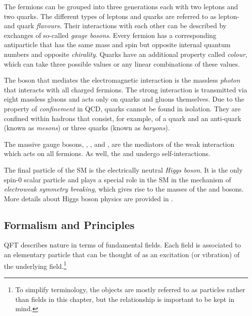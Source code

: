 The fermions can be grouped into three generations each with two leptons and two quarks. The different types of leptons and quarks are referred to as lepton- and quark \emph{flavours}.
Their interactions with each other can be described by exchanges of so-called \emph{gauge bosons}.
Every fermion has a corresponding antiparticle that has the same mass and spin but opposite internal quantum numbers and opposite \emph{chirality}.
Quarks have an additional property called \emph{colour}, which can take three possible values or any linear combinations of these values.

The boson that mediates the electromagnetic interaction is the massless \emph{photon} that interacts with all charged fermions.
The strong interaction is transmitted via eight massless gluons and acts only on quarks and gluons themselves.
Due to the property of \emph{confinement} in QCD, quarks cannot be found in isolation. They are confined within hadrons that consist, for example, of a quark and an anti-quark (known as \emph{mesons}) or three quarks (known as \emph{baryons}).

The massive gauge bosons, \Wplus, \Wminus, and \Zboson, are the mediators of the weak interaction which acts on all fermions. As well, the \Wmp and \Zboson undergo self-interactions.

The final particle of the SM is the electrically neutral \emph{Higgs boson}. It is the only spin-0 scalar particle and plays a special role in the SM in the mechanism of \emph{electroweak symmetry breaking}, which gives rise to the masses of the \Wpm and \Zboson bosons. More details about Higgs boson physics are provided in .


\subsection{Formalism and Principles}

QFT describes nature in terms of fundamental fields. Each field is associated to an elementary particle that can be thought of as an excitation (or vibration) of the underlying field.\footnote{To simplify terminology, the objects are mostly referred to as particles rather than fields in this chapter, but the relationship is important to be kept in mind.}

